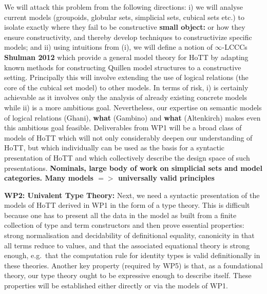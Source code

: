 \documentclass[a4paper,11pt]{article}
\begin{document}
We will attack this problem from the following directions: i) we will
analyse current models (groupoids, globular sets, simplicial sets,
cubical sets etc.) to isolate exactly where they fail to be
constructive {\bf small object:} or how they ensure constructivity,
and thereby develop techniques to constructivize specific models; and
ii) using intuitions from (i), we will define a notion of
$\infty$-LCCCs {\bf Shulman 2012} which provide a general model theory for HoTT 
by adapting known methods for
constructing Quillen model structures to a constructive setting.  
Principally this will involve extending the use of logical relations
(the core of the cubical set model) to other models.  In terms of
risk, i) is certainly achievable as it involves only the analysis of
already existing concrete models while ii) is a more ambitious
goal. Nevertheless, our expertise on semantic models of logical
relations (Ghani), {\bf what} (Gambino) and {\bf what} (Altenkirch)
makes even this ambitious goal feasible. Deliverables from WP1 will be
a broad class of models of HoTT which will not only considerably
deepen our understanding of HoTT, but which individually can be used
as the basis for a syntactic presentation of HoTT and which
collectively describe the design space of such presentations.  {\bf
  Nominals, large body of work on simplicial sets and model
  categories. Many models $=>$ universally valid principles}


{\bf WP2: Univalent Type Theory:} Next, we need a syntactic
presentation of the models of HoTT derived in WP1 in the form of a
type theory. This is difficult because one has to present all the data
in the model as built from a finite collection of type and term
constructors and then prove essential properties: strong normalisation
and decidability of definitional equality, canonicity in that all
terms reduce to values, and that the associated equational theory is
strong enough, e.g.\ that the computation rule for identity types is
valid definitionally in these theories. Another key property (required
by WP5) is that, as a foundational theory, our type theory ought to be
expressive enough to describe itself. These properties will be established
either directly or via the models of WP1.

\end{document}
